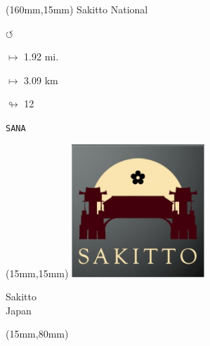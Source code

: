 \begin{textblock*}{40mm}(160mm,15mm)%
Sakitto National
\par \Huge$\circlearrowleft$
\Large
\par$\mapsto$ 1.92 mi.
\par$\mapsto$ 3.09 km
\par$\looparrowright$ 12
\par\hfill\tiny\tt SANA\\
\end{textblock*}
\null\newpage

\begin{textblock*}{50mm}(15mm,15mm)%
\includegraphics[width=50mm]{LG/2015-05-20_00093.png}
\par Sakitto\\ Japan
\end{textblock*}
\begin{textblock*}{185mm}(15mm,80mm)%
\end{textblock*}
